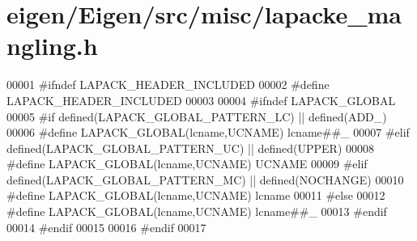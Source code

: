 \hypertarget{eigen_2_eigen_2src_2misc_2lapacke__mangling_8h_source}{}\section{eigen/\+Eigen/src/misc/lapacke\+\_\+mangling.h}
\label{eigen_2_eigen_2src_2misc_2lapacke__mangling_8h_source}

\begin{DoxyCode}
00001 \textcolor{preprocessor}{#ifndef LAPACK\_HEADER\_INCLUDED}
00002 \textcolor{preprocessor}{#define LAPACK\_HEADER\_INCLUDED}
00003 
00004 \textcolor{preprocessor}{#ifndef LAPACK\_GLOBAL}
00005 \textcolor{preprocessor}{#if defined(LAPACK\_GLOBAL\_PATTERN\_LC) || defined(ADD\_)}
00006 \textcolor{preprocessor}{#define LAPACK\_GLOBAL(lcname,UCNAME)  lcname##\_}
00007 \textcolor{preprocessor}{#elif defined(LAPACK\_GLOBAL\_PATTERN\_UC) || defined(UPPER)}
00008 \textcolor{preprocessor}{#define LAPACK\_GLOBAL(lcname,UCNAME)  UCNAME}
00009 \textcolor{preprocessor}{#elif defined(LAPACK\_GLOBAL\_PATTERN\_MC) || defined(NOCHANGE)}
00010 \textcolor{preprocessor}{#define LAPACK\_GLOBAL(lcname,UCNAME)  lcname}
00011 \textcolor{preprocessor}{#else}
00012 \textcolor{preprocessor}{#define LAPACK\_GLOBAL(lcname,UCNAME)  lcname##\_}
00013 \textcolor{preprocessor}{#endif}
00014 \textcolor{preprocessor}{#endif}
00015 
00016 \textcolor{preprocessor}{#endif}
00017 
\end{DoxyCode}
